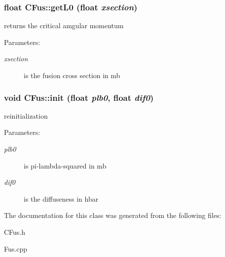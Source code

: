 \subsubsection{\setlength{\rightskip}{0pt plus 5cm}float CFus::get\-L0 (float {\em xsection})}\label{classCFus_0b4f73b7382eb571c149b2c2915b4f60}


returns the critical amgular momentum \begin{Desc}
\item[Parameters:]
\begin{description}
\item[{\em xsection}]is the fusion cross section in mb \end{description}
\end{Desc}
\subsubsection{\setlength{\rightskip}{0pt plus 5cm}void CFus::init (float {\em plb0}, float {\em dif0})}\label{classCFus_7320d51537731782ff768a2ba540c226}


reinitialization \begin{Desc}
\item[Parameters:]
\begin{description}
\item[{\em plb0}]is pi-lambda-squared in mb \item[{\em dif0}]is the diffuseness in hbar \end{description}
\end{Desc}


The documentation for this class was generated from the following files:\begin{CompactItemize}
\item 
CFus.h\item 
Fus.cpp\end{CompactItemize}
